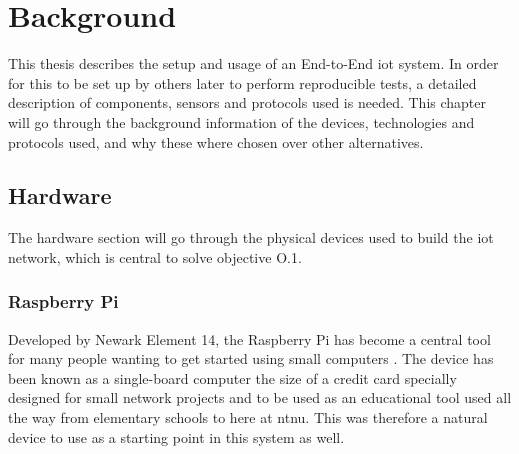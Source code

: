 \chapter{Background}
\label{chp:background} 

\noindent This thesis describes the setup and usage of an End-to-End \gls{iot} system. In order for this to be set up by others later to perform reproducible tests, a detailed description of components, sensors and protocols used is needed. This chapter will go through the background information of the devices, technologies and protocols used, and why these where chosen over other alternatives. 






\section{Hardware}

\noindent The hardware section will go through the physical devices used to build the \gls{iot} network, which is central to solve objective O.1. 

\subsection{Raspberry Pi}

\noindent Developed by Newark Element 14, the Raspberry Pi has become a central tool for many people wanting to get started using small computers \cite{newark}. The device has been known as a single-board computer the size of a credit card specially designed for small network projects and to be used as an educational tool used all the way from elementary schools to here at \gls{ntnu}. This was therefore a natural device to use as a starting point in this system as well. 

